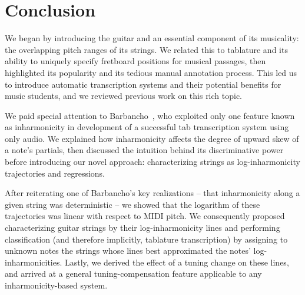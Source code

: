 \documentclass[12pt]{cmuthesis}
\begin{document}

\noindent
\chapter{Conclusion}
We began by introducing the guitar and an essential component of its musicality: the overlapping pitch ranges of its strings. We related this to tablature and its ability to uniquely specify fretboard positions for musical passages, then highlighted its popularity and its tedious manual annotation process. This led us to introduce automatic transcription systems and their potential benefits for music students, and we reviewed previous work on this rich topic.

We paid special attention to Barbancho~\cite{barbanchoi2012}, who exploited only one feature known as inharmonicity in development of a successful tab transcription system using only audio. We explained how inharmonicity affects the degree of upward skew of a note's partials, then discussed the intuition behind its discriminative power before introducing our novel approach: characterizing strings as log-inharmonicity trajectories and regressions.

After reiterating one of Barbancho's key realizations -- that inharmonicity along a given string was deterministic -- we showed that the logarithm of these trajectories was linear with respect to MIDI pitch. We consequently proposed characterizing guitar strings by their log-inharmonicity lines and performing classification (and therefore implicitly, tablature transcription) by assigning to unknown notes the strings whose lines best approximated the notes' log-inharmonicities. Lastly, we derived the effect of a tuning change on these lines, and arrived at a general tuning-compensation feature applicable to any inharmonicity-based system.
\end{document}
